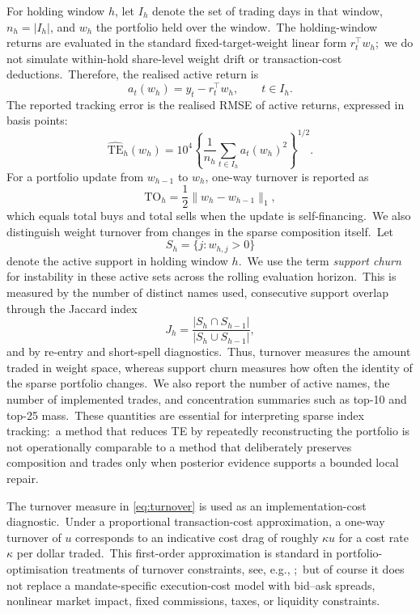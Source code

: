 \documentclass[11pt]{article}
\newcommand{\TE}{\ensuremath{\mathrm{TE}}}
\begin{document}
For holding window $h$, let $I_h$ denote the set of trading days in that window, $n_h=|I_h|$, and $w_h$ the portfolio held over the window.\ The holding-window returns are evaluated in the standard fixed-target-weight linear form \(r_t^\top w_h\);\ we do not simulate within-hold share-level weight drift or transaction-cost deductions.\ Therefore, the realised active return is
\begin{equation}
  a_t(w_h)=y_t-r_t^\top w_h,\qquad t\in I_h .
\end{equation}
The reported tracking error is the realised RMSE of active returns, expressed in basis points:
\begin{equation}
  \widehat{\TE}_h(w_h)
  =10^4\left\{\frac{1}{n_h}\sum_{t\in I_h} a_t(w_h)^2\right\}^{1/2} .
  \label{eq:hold-te}
\end{equation}
For a portfolio update from $w_{h-1}$ to $w_h$, one-way turnover is reported as
\begin{equation}
  \mathrm{TO}_h = \frac{1}{2}\|w_h-w_{h-1}\|_1,
  \label{eq:turnover}
\end{equation}
which equals total buys and total sells when the update is self-financing.\ We also distinguish weight turnover from changes in the sparse composition itself.\ Let
\[
  S_h=\{j:w_{h,j}>0\}
\]
denote the active support in holding window \(h\).\ We use the term \emph{support churn} for instability in these active sets across the rolling evaluation horizon.\ This is measured by the number of distinct names used, consecutive support overlap through the Jaccard index
\[
  J_h=\frac{|S_h\cap S_{h-1}|}{|S_h\cup S_{h-1}|},
\]
and by re-entry and short-spell diagnostics.\ Thus, turnover measures the amount traded in weight space, whereas support churn measures how often the identity of the sparse portfolio changes.\ We also report the number of active names, the number of implemented trades, and concentration summaries such as top-10 and top-25 mass.\ These quantities are essential for interpreting sparse index tracking:\ a method that reduces TE by repeatedly reconstructing the portfolio is not operationally comparable to a method that deliberately preserves composition and trades only when posterior evidence supports a bounded local repair.

The turnover measure in \eqref{eq:turnover} is used as an implementation-cost diagnostic.\ Under a proportional transaction-cost approximation, a one-way turnover of $u$ corresponds to an indicative cost drag of roughly $\kappa u$ for a cost rate $\kappa$ per dollar traded.\ This first-order approximation is standard in portfolio-optimisation treatments of turnover constraints, see, e.g.,  \cite[Sec.~6.2.5]{PalomarBook};\ but of course it does not replace a mandate-specific execution-cost model with bid--ask spreads, nonlinear market impact, fixed commissions, taxes, or liquidity constraints.
\end{document}
